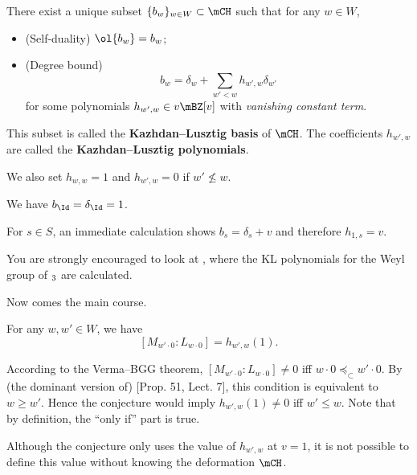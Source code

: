 \begin{thmdefn}
	There exist a unique subset $\{ b_w \}_{w\in W} \subset \mCH$ such that for any $w\in W$,
	\begin{itemize}
		\item
			(Self-duality) $\ol{b_w} = b_w$;
		\item
			(Degree bound) 
			\[
				b_w = \delta_w + \sum_{w'<w} h_{w',w} \delta_{w'}
			\]
			for some polynomials $h_{w',w} \in v\mBZ[v]$ with \emph{vanishing constant term}.
	\end{itemize}
	This subset is called the \textbf{Kazhdan--Lusztig basis} of $\mCH$. The coefficients $h_{w',w}$ are called the \textbf{Kazhdan--Lusztig polynomials}.
\end{thmdefn}

\begin{convn}
	We also set $h_{w,w}=1$ and $h_{w',w}=0$ if $w'\nleq w$.
\end{convn}

\begin{exam}
	We have $b_{\Id} = \delta_{\Id} = 1$.
\end{exam}

\begin{exam}
	For $s\in S$, an immediate calculation shows $b_s = \delta_s +v$ and therefore $h_{1,s} = v$.
\end{exam}

\begin{rem}
	You are strongly encouraged to look at \cite[Sect. 3.3.1]{EMTW}, where the KL polynomials for the Weyl group of $\sl_3$ are calculated.
\end{rem}

	Now comes the main course.

\begin{conje}
	For any $w,w' \in W$, we have
	\[
		[M_{w'\cdot 0}: L_{w\cdot 0}] = h_{w',w}(1).
	\]
\end{conje}

\begin{rem}
	According to the Verma--BGG theorem, $[M_{w'\cdot 0}: L_{w\cdot 0}]\neq 0$ iff $w\cdot 0 \preceq_\subset w'\cdot 0$. By (the dominant version of) [Prop. 51, Lect. 7], this condition is equivalent to $w\ge w'$. Hence the conjecture would imply $h_{w',w}(1)\neq 0$ iff $w'\le w$. Note that by definition, the ``only if'' part is true.

\end{rem}

\begin{rem}
	Although the conjecture only uses the value of $h_{w',w}$ at $v=1$, it is not possible to define this value without knowing the deformation $\mCH$.

\end{rem}

